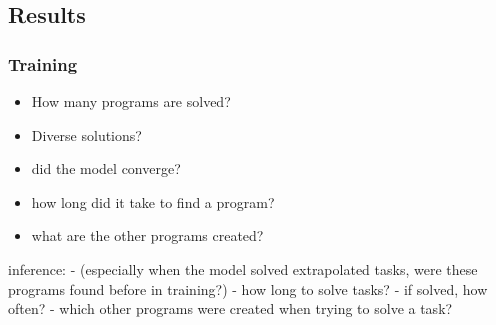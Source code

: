 






















\subsection{Results}

\subsubsection{Training}
\begin{itemize}
    \item How many programs are solved?
    \item Diverse solutions?
    \item did the model converge? 
    \item how long did it take to find a program?
    \item what are the other programs created?
\end{itemize}





inference:
- (especially when the model solved extrapolated tasks, were these programs found before in training?)
- how long to solve tasks? 
- if solved, how often?
- which other programs were created when trying to solve a task?

